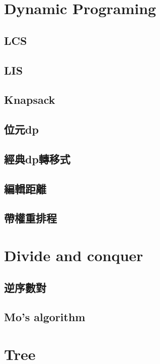 \section{Dynamic Programing}
\subsection{LCS}

\subsection{LIS}

\subsection{Knapsack}

\subsection{位元dp}

\subsection{經典dp轉移式}

\subsection{編輯距離}

\subsection{帶權重排程}


\section{Divide and conquer}
\subsection{逆序數對}

\subsection{Mo's algorithm}


\section{Tree}
